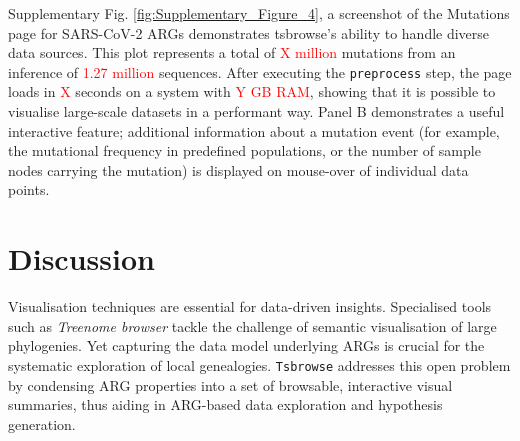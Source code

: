 \documentclass[unnumsec,webpdf,contemporary,large,namedate]{oup-authoring-template}%
\begin{document}
Supplementary Fig. \ref{fig:Supplementary_Figure_4}, a screenshot of the
Mutations page for SARS-CoV-2 ARGs \citep{zhan2023towards} demonstrates
tsbrowse's ability to handle diverse data sources. This plot represents a total
of \textcolor{red}{X million} mutations from an inference of
\textcolor{red}{1.27 million} sequences. After executing the
\texttt{preprocess} step, the page loads in \textcolor{red}{X} seconds on a
system with \textcolor{red}{Y GB RAM}, showing that it is possible to visualise
large-scale datasets in a performant way. Panel B demonstrates a useful
interactive feature; additional information about a mutation event (for
example, the mutational frequency in predefined populations, or the number of
sample nodes carrying the mutation) is displayed on mouse-over of individual
data points.

\section{Discussion} \label{sec:Discussion} Visualisation techniques are
essential for data-driven insights. Specialised tools such as \textit{Treenome
browser} \citep{Kramer2023} tackle the challenge of semantic visualisation of
large phylogenies. Yet capturing the data model underlying ARGs is crucial for
the systematic exploration of local genealogies. \texttt{Tsbrowse} addresses
this open problem by condensing ARG properties into a set of browsable,
interactive visual summaries, thus aiding in ARG-based data exploration and
hypothesis generation.

\end{document}
